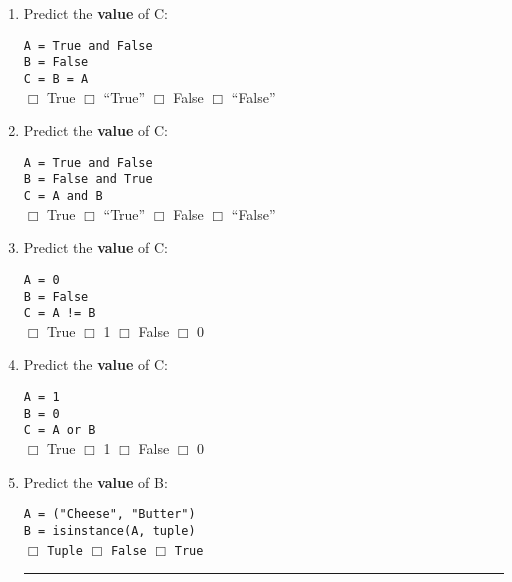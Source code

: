 \documentclass[11pt]{report}
\begin{document}
\begin{enumerate}
    \item Predict the \textbf{value} of C:

    {\tt A = True and False}\\
    {\tt B = False}\\
    {\tt C = B = A}\\
    $\Box$ True \hspace{3em} $\Box$ ``True'' \hspace{3em} $\Box$ False \hspace{3em} $\Box$ ``False''

    \item Predict the \textbf{value} of C:

    {\tt A = True and False}\\
    {\tt B = False and True}\\
    {\tt C = A and B}\\
    $\Box$ True \hspace{3em} $\Box$ ``True'' \hspace{3em} $\Box$ False \hspace{3em} $\Box$ ``False''

    \item Predict the \textbf{value} of C:

    {\tt A = 0}\\
    {\tt B = False}\\
    {\tt C = A != B}\\
    $\Box$ True \hspace{3em} $\Box$ 1 \hspace{3em} $\Box$ False \hspace{3em} $\Box$ 0

    \item Predict the \textbf{value} of C:

    {\tt A = 1}\\
    {\tt B = 0}\\
    {\tt C = A or B}\\
    $\Box$ True \hspace{3em} $\Box$ 1 \hspace{3em} $\Box$ False \hspace{3em} $\Box$ 0

    \item Predict the \textbf{value} of B:

    {\tt A = ("Cheese", "Butter")}\\
    {\tt B = isinstance(A, tuple)}\\
    $\Box$ {\tt Tuple} \hspace{3em} $\Box$ {\tt False} \hspace{3em} $\Box$ {\tt True}

    \vspace{2em}
    \hrule
    \vspace{1em}

\end{enumerate}
\end{document}
